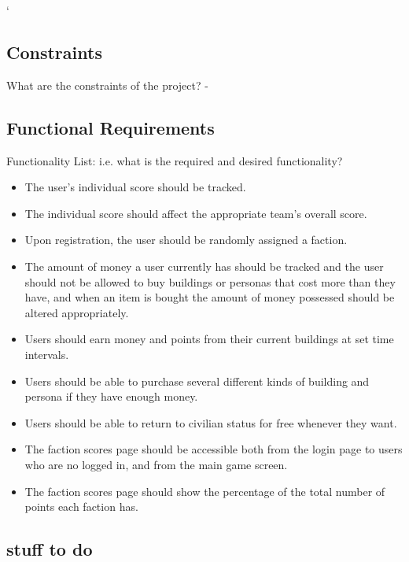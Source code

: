 `\documentclass{sig-alt-release2}
\begin{document}
\subsection{Constraints}

What are the constraints of the project?
-

\subsection{Functional Requirements}

Functionality List: i.e. what is the required and desired functionality?

\begin{itemize}

\item The user's individual score should be tracked.

\item The individual score should affect the appropriate team's overall score.

\item Upon registration, the user should be randomly assigned a faction.

\item The amount of money a user currently has should be tracked and the user should not be allowed to buy buildings or personas that cost more than they have, and when an item is bought the amount of money possessed should be altered appropriately.

\item Users should earn money and points from their current buildings at set time intervals.

\item Users should be able to purchase several different kinds of building and persona if they have enough money.

\item Users should be able to return to civilian status for free whenever they want.

\item The faction scores page should be accessible both from the login page to users who are no logged in, and from the main game screen.

\item The faction scores page should show the percentage of the total number of points each faction has.

\end{itemize}

\subsection{stuff to do} 
\end{document}
